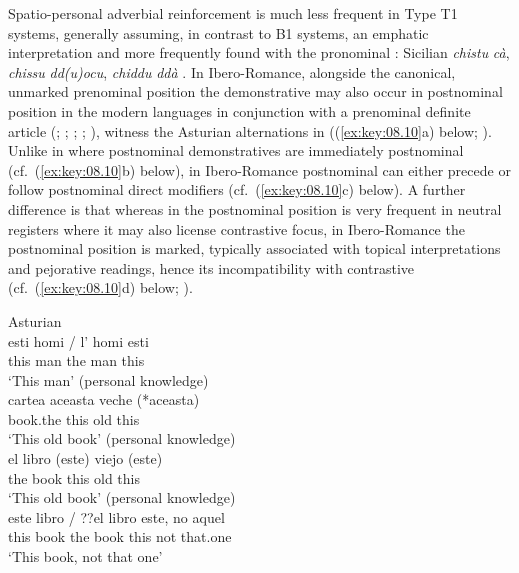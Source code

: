 \documentclass[output=paper]{langsci/langscibook}
\begin{document}
Spatio-personal adverbial reinforcement is much less frequent in Type T1
systems, generally assuming, in contrast to B1 systems, an emphatic
interpretation and more frequently found with the pronominal :
Sicilian \emph{chistu} \emph{cà}, \emph{chissu} \emph{dd(u)ocu}, \emph{chiddu}
\emph{ddà} \citep[72]{Pitre:1995a}. In Ibero-Romance, alongside the canonical,
unmarked prenominal position the demonstrative may also occur in postnominal
position in the modern languages in conjunction with a prenominal definite
article (\citealt[84]{Butt:1994a}; \citealt{Bruge:1996a};
\citealt{Bruge:2002a}; \citealt[559--561]{Eguren:2012a};
\citealt[113f]{ledgeway2012latin}), witness the Asturian alternations in
((\ref{ex:key:08.10}a) below; \citealt[104f]{ALIA:2001a}). Unlike in  where postnominal
demonstratives are immediately postnominal (cf.\ (\ref{ex:key:08.10}b) below), in Ibero-Romance
postnominal  can either precede or follow postnominal direct
modifiers (cf.\ (\ref{ex:key:08.10}c) below). A further difference is that whereas in  the
postnominal position is very frequent in neutral registers where it may also
license contrastive focus, in Ibero-Romance the postnominal position is marked,
typically associated with topical interpretations and pejorative readings,
hence its incompatibility with contrastive  (cf.\ (\ref{ex:key:08.10}d) below;
\citealt{Roca:2009a}).

\ea\label{bkm:Ref370498803}\label{ex:key:08.10}
    \ea Asturian \citep{ALIA:2001a}\\
    \gll esti  homi /  l’  homi  esti\\
            this  man  {} the  man  this\\
    \glt    \enquote*{This man}
    \ex     {} (personal knowledge)\\
    \gll cartea  aceasta  veche (*aceasta)\\
            book.the  this  old   \hphantom{(*}this\\
    \glt    \enquote*{This old book}
    \ex     {} (personal knowledge)\\
    \gll el  libro  (este)  viejo  (este)\\
    the  book  \hphantom{(}this  old  \hphantom{(}this\\
    \glt    \enquote*{This old book}
    \ex     {} (personal knowledge)\\
    \gll este  libro /  ??el  libro  este,  no  aquel\\
            this  book {} \hphantom{??}the  book  this  not  that.one\\
    \glt    \enquote*{This book, not that one}
    \z
\z
\end{document}
